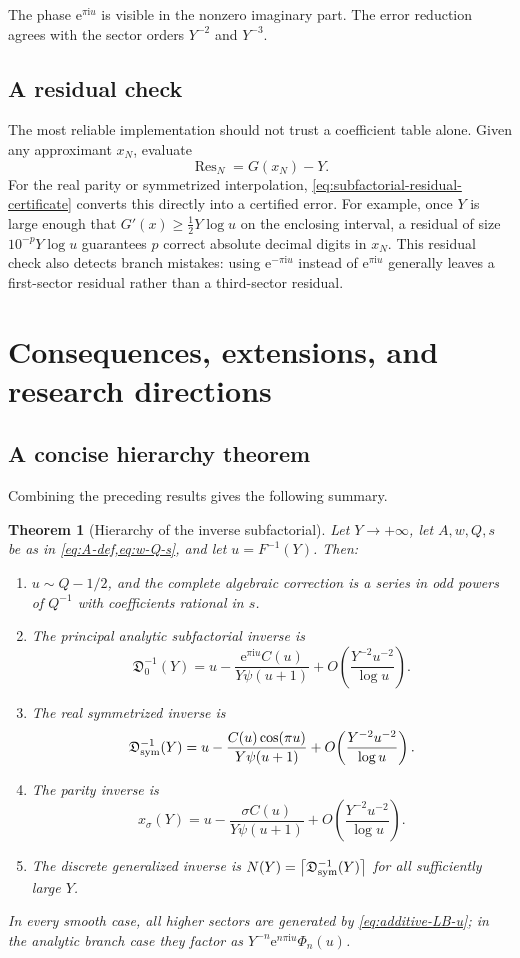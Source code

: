 \documentclass[11pt]{article}
\numberwithin{equation}{section}
\theoremstyle{mainthm}
\newtheorem{theorem}{Theorem}[section]
\theoremstyle{defstyle}
\theoremstyle{remark}
\newcommand{\e}{\mathrm e}
\newcommand{\ii}{\mathrm i}
\newcommand{\Dsub}{\mathfrak D}
\newcommand{\Res}{\operatorname{Res}}
\newcommand{\ceil}[1]{\left\lceil #1\right\rceil}
\begin{document}
The phase \(\e^{\pi\ii u}\) is visible in the nonzero imaginary part.  The error reduction agrees with the sector orders \(Y^{-2}\) and \(Y^{-3}\).

\subsection{A residual check}

The most reliable implementation should not trust a coefficient table alone.  Given any approximant \(x_N\), evaluate
\[
 \Res_N=G(x_N)-Y.
\]
For the real parity or symmetrized interpolation, \cref{eq:subfactorial-residual-certificate} converts this directly into a certified error.  For example, once \(Y\) is large enough that \(G'(x)\ge\tfrac12Y\log u\) on the enclosing interval, a residual of size \(10^{-p}Y\log u\) guarantees \(p\) correct absolute decimal digits in \(x_N\).  This residual check also detects branch mistakes: using \(\e^{-\pi\ii u}\) instead of \(\e^{\pi\ii u}\) generally leaves a first-sector residual rather than a third-sector residual.

\section{Consequences, extensions, and research directions}\label{sec:directions}

\subsection{A concise hierarchy theorem}

Combining the preceding results gives the following summary.

\begin{theorem}[Hierarchy of the inverse subfactorial]\label{thm:hierarchy-summary}
Let \(Y\to+\infty\), let \(A,w,Q,s\) be as in \cref{eq:A-def,eq:w-Q-s}, and let \(u=F^{-1}(Y)\).  Then:
\begin{enumerate}
\item \(u\sim Q-1/2\), and the complete algebraic correction is a series in odd powers of \(Q^{-1}\) with coefficients rational in \(s\).
\item The principal analytic subfactorial inverse is
\[
 \Dsub_0^{-1}(Y)
 =u-\frac{\e^{\pi\ii u}C(u)}{Y\psi(u+1)}
 +O\!\left(\frac{Y^{-2}u^{-2}}{\log u}\right).
\]
\item The real symmetrized inverse is
\[
 \Dsub_{\rm sym}^{-1}(Y)
 =u-\frac{C(u)\cos(\pi u)}{Y\psi(u+1)}
 +O\!\left(\frac{Y^{-2}u^{-2}}{\log u}\right).
\]
\item The parity inverse is
\[
 x_\sigma(Y)
 =u-\frac{\sigma C(u)}{Y\psi(u+1)}
 +O\!\left(\frac{Y^{-2}u^{-2}}{\log u}\right).
\]
\item The discrete generalized inverse is \(N(Y)=\ceil{\Dsub_{\rm sym}^{-1}(Y)}\) for all sufficiently large \(Y\).
\end{enumerate}
In every smooth case, all higher sectors are generated by \cref{eq:additive-LB-u}; in the analytic branch case they factor as \(Y^{-n}\e^{n\pi\ii u}\Phi_n(u)\).
\end{theorem}
\end{document}
